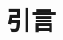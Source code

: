 \documentclass{article}
\title{}
\author{}
\date{\today}
\begin{document}
\maketitle

\section{引言}
\end{document}

